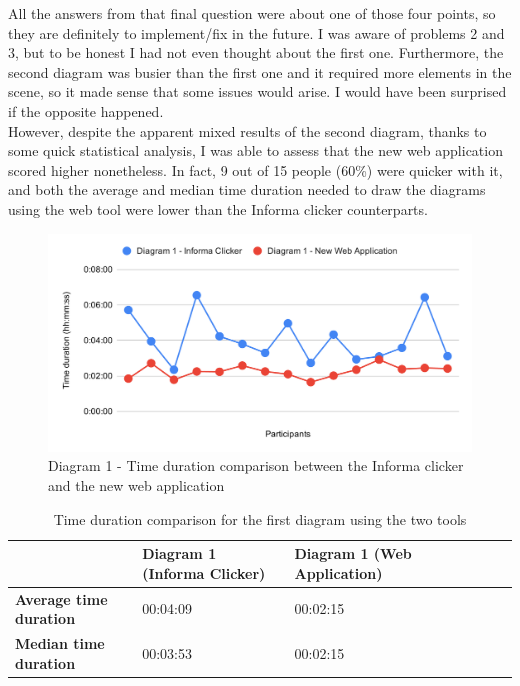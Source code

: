 \documentclass[]{usiinfbachelorproject}
\begin{document}
\noindent All the answers from that final question were about one of those four points, so they are definitely to implement/fix in the future. I was aware of problems 2 and 3, but to be honest I had not even thought about the first one. Furthermore, the second diagram was busier than the first one and it required more elements in the scene, so it made sense that some issues would arise. I would have been surprised if the opposite happened.\\
However, despite the apparent mixed results of the second diagram, thanks to some quick statistical analysis, I was able to assess that the new web application scored higher nonetheless. In fact, 9 out of 15 people (60\%) were quicker with it, and both the average and median time duration needed to draw the diagrams using the web tool were lower than the Informa clicker counterparts. 

\begin{figure}[h!]
\centering
\includegraphics[scale=0.6]{figures/diagram1-time-comparison.png}
\caption {Diagram 1 - Time duration comparison between the Informa clicker and the new web application}
\end{figure}

\begin{table}[h!]
\centering
\begin{tabular}{|l|l|l|l|l|l|l|}
\hline
 & \textbf{Diagram 1 (Informa Clicker)} & \textbf{Diagram 1 (Web Application)} \\ \hline
\textbf{Average time duration} & 00:04:09 & 00:02:15 \\ \hline
\textbf{Median time duration} & 00:03:53 & 00:02:15 \\ \hline
\end{tabular}
\caption{Time duration comparison for the first diagram using the two tools}
\end{table}
\end{document}
